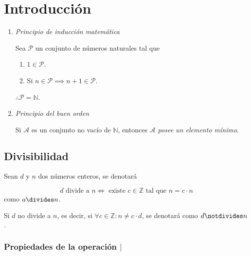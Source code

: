 \documentclass[oneside,a5paper]{memoir}
\begin{document}
\renewcommand{\contentsname}{Tabla de contenido}
\tableofcontents

\chapter{Introducción}%

\begin{enumerate}[font={\bfseries},label={\roman*.}]

\item\label{pr:1} \emph{Principio de inducción matemática}
	
Sea $\mathcal{P}$ un conjunto de números naturales tal que

\begin{enumerate}
	\item $1\in\mathcal{P}$.
	\item Si $n\in\mathcal{P}\implies n+1\in\mathcal{P}$.
\end{enumerate}

$\therefore \boxed{\mathcal{P}=\mathbb{N}}$.

\item\label{pr:2} \emph{Principio del buen orden}

Si $\mathcal{A}$ es un conjunto no vacío de $\mathbb{N}$, entonces \emph{$\mathcal{A}$ posee un elemento mínimo}.

\end{enumerate}

\section{Divisibilidad}

\begin{definition}\label{def:1.1}

Sean $d$ y $n$ dos números enteros, se denotará

\[\boxed{d\text{ divide a }n\iff\text{ existe }c\in\mathbb{Z}\text{ tal que }n=c\cdot n}\]
como $a\divides n$.

\noindent
Si $d$ no divide a $n$, es decir, si $\forall c\in\mathbb{Z}\colon n\neq c\cdot d$, se denotará como $d\notdivides n$.

\end{definition}

\subsection{Propiedades de la operación $|$}
\end{document}

